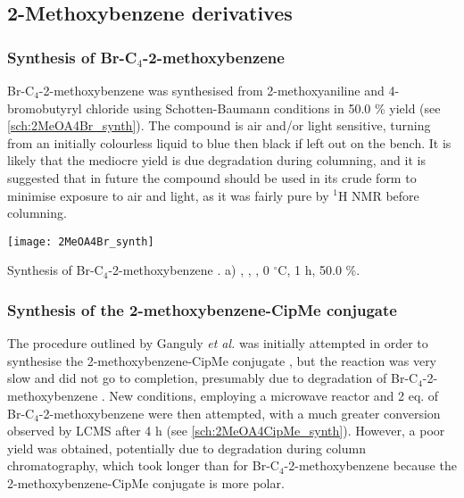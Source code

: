 
\subsection{2-Methoxybenzene derivatives\label{sec:2MeO}}

\subsubsection{Synthesis of Br-C$_4$-2-methoxybenzene }

Br-C$_4$-2-methoxybenzene  was synthesised from 2-methoxyaniline  and 4-bromobutyryl chloride  using Schotten-Baumann conditions in 50.0 \% yield (see \ref{sch:2MeOA4Br_synth}). The compound is air and/or light sensitive, turning from an initially colourless liquid to blue then black if left out on the bench. It is likely that the mediocre yield is due degradation during columning, and it is suggested that in future the compound should be used in its crude form to minimise exposure to air and light, as it was fairly pure by $^{1}$H NMR before columning.

\begin{scheme}[H]
	\begin{center}
		\texttt{[image: 2MeOA4Br\_synth]}
		\caption{Synthesis of Br-C$_4$-2-methoxybenzene .
		a) , , , 0 $^{\circ}$C, 1 h, 50.0 \%.
		\label{sch:2MeOA4Br_synth}}
	\end{center}
\end{scheme}

\subsubsection{Synthesis of the 2-methoxybenzene-CipMe conjugate }

The procedure outlined by Ganguly \textit{et al.}\cite{Ganguly2011} was initially attempted in order to synthesise the 2-methoxybenzene-CipMe conjugate , but the reaction was very slow and did not go to completion, presumably due to degradation of Br-C$_4$-2-methoxybenzene .
New conditions, employing a microwave reactor and 2 eq. of Br-C$_4$-2-methoxybenzene  were then attempted, with a much greater conversion observed by LCMS after 4 h (see \ref{sch:2MeOA4CipMe_synth}). However, a poor yield was obtained, potentially due to degradation during column chromatography, which took longer than for Br-C$_4$-2-methoxybenzene  because the 2-methoxybenzene-CipMe conjugate  is more polar.

